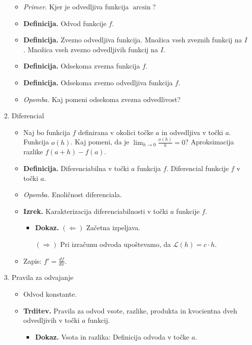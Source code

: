 \begin{enumerate}
\begin{itemize}
        \item \colorbox{yellow!30}{\emph{Primer.}} Kjer je odvedljiva funkcija $\arcsin$?
        \item \colorbox{purple!30}{\textbf{Definicija.}} Odvod funkcije $f$.
        \item \colorbox{purple!30}{\textbf{Definicija.}} Zvezno odvedljiva funkcija. Množica vseh zveznih funkcij na $I$. Množica vseh zvezno odvedljivih funkcij na $I$.
        \item \colorbox{purple!30}{\textbf{Definicija.}} Odsekoma zvezna funkcija $f$.
        \item \colorbox{purple!30}{\textbf{Definicija.}} Odsekoma zvezno odvedljiva funkcija $f$.
        \item \colorbox{yellow!30}{\emph{Opomba.}} Kaj pomeni odsekoma zvezna odvedlivost?
    \end{itemize}

    \item Diferencial
    \begin{itemize}
        \item Naj bo funkcija $f$ definirana v okolici točke $a$ in odvedljiva v točki $a$. Funkcija $o(h)$. Kaj pomeni, da je $\lim_{h \to 0} \frac{o(h)}{h}=0$? Aproksimacija razlike $f(a+h)-f(a)$.
        \item \colorbox{purple!30}{\textbf{Definicija.}} Diferenciabilna v točki $a$ funkcija $f$. Diferencial funkcije $f$ v točki $a$.
        \item \colorbox{yellow!30}{\emph{Opomba.}} Enoličnost diferenciala.
        \item \colorbox{blue!30}{\textbf{Izrek.}} Karakterizacija diferenciabilnosti v točki $a$ funkcije $f$.
        \begin{itemize}
            \item \colorbox{green!30}{\textbf{Dokaz.}} $(\Leftarrow)$ Začetna izpeljava.
            
            $(\Rightarrow)$ Pri izračunu odvoda upoštevamo, da $\mathcal{L}(h) = c \cdot h$.
        \end{itemize}
        \item Zapis: $f' = \frac{df}{dx}$.
    \end{itemize}

    \item Pravila za odvajanje
    \begin{itemize}
        \item Odvod konstante.
        \item \colorbox{blue!30}{\textbf{Trditev.}} Pravila za odvod vsote, razlike, produkta in kvocientna dveh odvedljivih v točki $a$ funkcij.
        \begin{itemize}
            \item \colorbox{green!30}{\textbf{Dokaz.}} Vsota in razlika: Definicija odvoda v točke $a$.
            

\end{itemize}
\end{itemize}
\end{enumerate}
